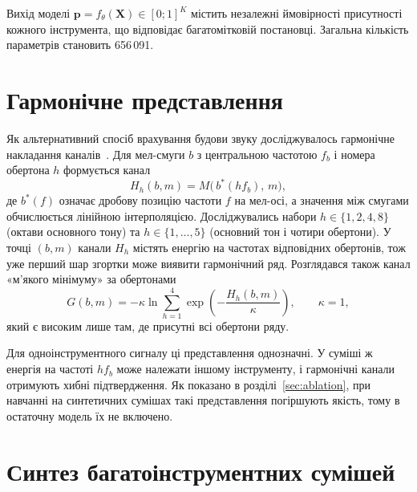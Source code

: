 Вихід моделі $\mathbf{p} = f_\theta(\mathbf{X}) \in [0;1]^K$ містить
незалежні ймовірності присутності кожного інструмента, що відповідає
багатомітковій постановці. Загальна кількість параметрів становить
656\,091.

\section{Гармонічне представлення}
\label{sec:harmrep}

Як альтернативний спосіб врахування будови звуку досліджувалось
гармонічне накладання каналів~\cite{bittner2017}. Для мел-смуги $b$ з
центральною частотою $f_b$ і номера обертона $h$ формується канал
\begin{equation}
    H_h(b, m) = M\big(\,b^{*}(h f_b),\, m\big),
\end{equation}
де $b^{*}(f)$ означає дробову позицію частоти $f$ на мел-осі, а значення
між смугами обчислюється лінійною інтерполяцією. Досліджувались набори
$h \in \{1, 2, 4, 8\}$ (октави основного тону) та $h \in \{1, \ldots, 5\}$
(основний тон і чотири обертони). У точці $(b, m)$ канали $H_h$ містять
енергію на частотах відповідних обертонів, тож уже перший шар згортки
може виявити гармонічний ряд.
Розглядався також канал «м'якого мінімуму» за обертонами
\begin{equation}
    G(b, m) = -\kappa \ln \sum_{h=1}^{4} \exp\!\left(-\frac{H_h(b,m)}{\kappa}\right),
    \qquad \kappa = 1,
\end{equation}
який є високим лише там, де присутні всі обертони ряду.

Для одноінструментного сигналу ці представлення однозначні. У суміші ж
енергія на частоті $h f_b$ може належати іншому інструменту, і
гармонічні канали отримують хибні підтвердження. Як показано в
розділі~\ref{sec:ablation}, при навчанні на синтетичних сумішах такі
представлення погіршують якість, тому в остаточну модель їх не включено.

\section{Синтез багатоінструментних сумішей}
\label{sec:mixing}

